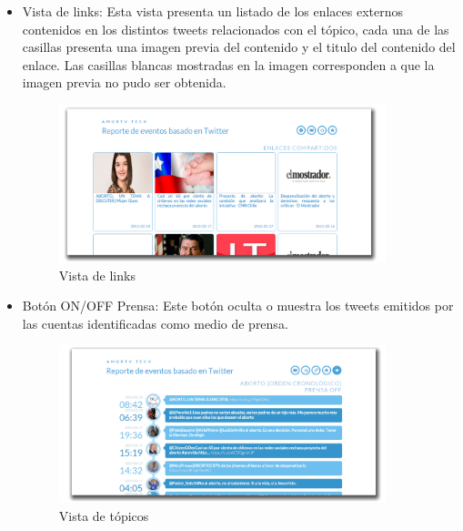\begin{itemize}
	\item {Vista de links}: Esta vista presenta un listado de los enlaces externos contenidos en los distintos tweets relacionados con el tópico, cada una de las casillas presenta una imagen previa del contenido y el titulo del contenido del enlace. Las casillas blancas mostradas en la imagen corresponden a que la imagen previa no pudo ser obtenida.
	\begin{figure}[H]
		\centering
		\includegraphics[width=0.9\textwidth]{imgs/vistas_links.PNG}
		\caption{Vista de links}
		\label{fig:vista_links}
	\end{figure}
		
	\item {Botón ON/OFF Prensa}: Este botón oculta o muestra los tweets emitidos por las cuentas identificadas como medio de prensa.
	\begin{figure}[H]
		\centering
		\includegraphics[width=0.9\textwidth]{imgs/vistas_prensa_off.PNG}
		\caption{Vista de tópicos}
		\label{fig:vista_btnprensa_off}
	\end{figure}
	

	
\end{itemize}